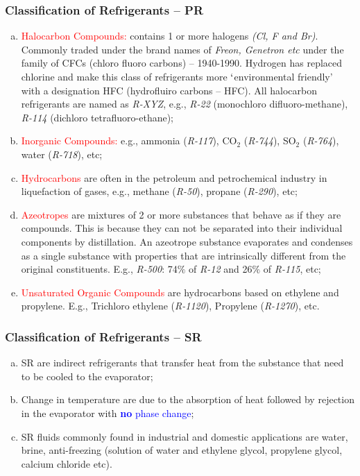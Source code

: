 \documentclass[10pt,compress,handout,ignorenonframetext]{beamer}
\begin{document}
\begin{frame}
 \frametitle{Classification of Refrigerants -- PR}
 \begin{enumerate}[(a)]
   \item <1-> \textcolor{red}{Halocarbon Compounds:} contains 1 or more halogens {\it (Cl, F and Br)}. Commonly traded under the brand names of {\it Freon, Genetron etc} under the family of CFCs (chloro fluoro carbons) -- 1940-1990. Hydrogen has replaced chlorine and make this class of refrigerants more $\lq$environmental friendly' with a designation HFC (hydrofluiro carbons -- HFC). All halocarbon refrigerants are named as {\it R-XYZ}, e.g., {\it R-22} (monochloro difluoro-methane), {\it R-114} (dichloro tetrafluoro-ethane); 
   \item <2-> \textcolor{red}{Inorganic Compounds:} e.g., ammonia ({\it R-117}), CO$_{2}$ ({\it R-744}), SO$_{2}$ ({\it R-764}), water ({\it R-718}), etc;
   \item <3-> \textcolor{red}{Hydrocarbons} are often in the petroleum and petrochemical industry in liquefaction of gases, e.g., methane ({\it R-50}), propane ({\it R-290}), etc;
   \item <4-> \textcolor{red}{Azeotropes} are mixtures of 2 or more substances that behave as if they are compounds. This is because they can not be separated into their individual components by distillation. An azeotrope substance evaporates and condenses as a single substance with properties that are intrinsically different from the original constituents. E.g., {\it R-500}: 74$\%$ of {\it R-12} and 26$\%$ of {\it R-115}, etc;
   \item <5-> \textcolor{red}{Unsaturated Organic Compounds} are hydrocarbons based on ethylene and propylene. E.g., Trichloro ethylene ({\it R-1120}), Propylene ({\it R-1270}), etc.
 \end{enumerate}
\end{frame}

\begin{frame}
 \frametitle{Classification of Refrigerants -- SR}
 \begin{enumerate}[(a)]
   \item <1-> SR are indirect refrigerants that transfer heat from the substance that need to be cooled to the evaporator; 
   \item <2-> Change in temperature are due to the absorption of heat followed by rejection in the evaporator with \textcolor{blue}{{\bf no} phase change};
   \item <3-> SR fluids commonly found in industrial and domestic applications are water, brine, anti-freezing (solution of water and ethylene glycol, propylene glycol, calcium chloride etc).
 \end{enumerate}
\end{frame}
\end{document}
